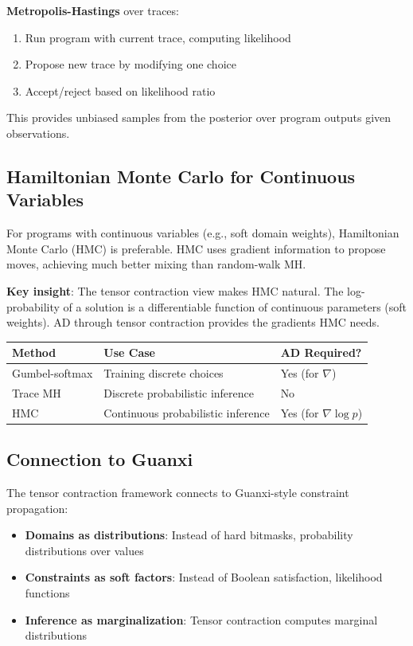 \documentclass[11pt,a4paper]{article}
\begin{document}
\textbf{Metropolis-Hastings} over traces:
\begin{enumerate}
  \item Run program with current trace, computing likelihood
  \item Propose new trace by modifying one choice
  \item Accept/reject based on likelihood ratio
\end{enumerate}

This provides unbiased samples from the posterior over program outputs given observations.

\subsection{Hamiltonian Monte Carlo for Continuous Variables}
\label{subsec:hmc_chirho}

For programs with continuous variables (e.g., soft domain weights), Hamiltonian Monte Carlo (HMC) is preferable.
HMC uses gradient information to propose moves, achieving much better mixing than random-walk MH.

\textbf{Key insight}: The tensor contraction view makes HMC natural.
The log-probability of a solution is a differentiable function of continuous parameters (soft weights).
AD through tensor contraction provides the gradients HMC needs.

\begin{center}
\begin{tabular}{lll}
\toprule
\textbf{Method} & \textbf{Use Case} & \textbf{AD Required?} \\
\midrule
Gumbel-softmax & Training discrete choices & Yes (for $\nabla$) \\
Trace MH & Discrete probabilistic inference & No \\
HMC & Continuous probabilistic inference & Yes (for $\nabla \log p$) \\
\bottomrule
\end{tabular}
\end{center}

\subsection{Connection to Guanxi}
\label{subsec:guanxi_chirho}

The tensor contraction framework connects to Guanxi-style constraint propagation:
\begin{itemize}
  \item \textbf{Domains as distributions}: Instead of hard bitmasks, probability distributions over values
  \item \textbf{Constraints as soft factors}: Instead of Boolean satisfaction, likelihood functions
  \item \textbf{Inference as marginalization}: Tensor contraction computes marginal distributions
\end{itemize}
\end{document}
